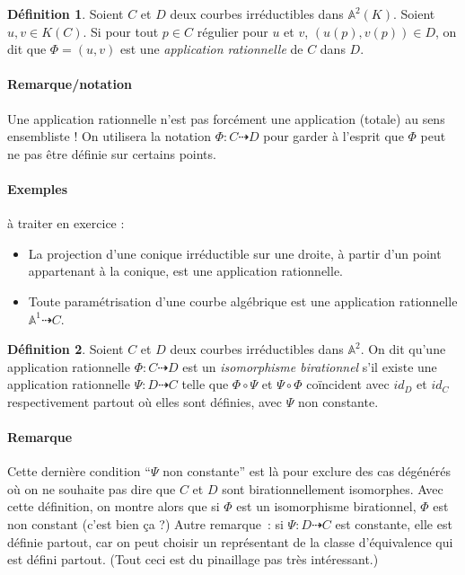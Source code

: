 \documentclass[a4paper, 11pt]{article}
\theoremstyle{definition}
\newtheorem{définition}{Définition}
\newcommand{\aff}{\mathbb{A}}
\begin{document}
\begin{définition}
  Soient $C$ et $D$ deux courbes irréductibles dans
  $\aff^2(K)$. Soient $u, v \in K(C)$. Si pour tout $p \in C$ régulier
  pour $u$ et $v$, $(u(p), v(p)) \in D$, on dit que $\Phi = (u,v)$ est
  une \emph{application rationnelle} de $C$ dans $D$.
\end{définition}
\paragraph{Remarque/notation} Une application rationnelle n'est pas
forcément une application (totale) au sens ensembliste ! On utilisera
la notation $\Phi : C \dashrightarrow D$ pour garder à l'esprit que
$\Phi$ peut ne pas être définie sur certains points.

\paragraph{Exemples} à traiter en exercice :
\begin{itemize}
\item La projection d'une conique irréductible sur une droite, à
  partir d'un point appartenant à la conique, est une application
  rationnelle.
\item Toute paramétrisation d'une courbe algébrique est une
  application rationnelle $\aff^1 \dashrightarrow C$.
\end{itemize}

\begin{définition}
  Soient $C$ et $D$ deux courbes irréductibles dans $\aff^2$. On dit
  qu'une application rationnelle $\Phi : C \dashrightarrow D$ est un
  \emph{isomorphisme birationnel} s'il existe une application
  rationnelle $\Psi : D \dashrightarrow C$ telle que $\Phi \circ \Psi$
  et $\Psi \circ \Phi$ coïncident avec $id_D$ et $id_C$ respectivement
  partout où elles sont définies, avec $\Psi$ non constante.
\end{définition}
\paragraph{Remarque} Cette dernière condition \enquote{$\Psi$ non
  constante} est là pour exclure des cas dégénérés où on ne souhaite
pas dire que $C$ et $D$ sont birationnellement isomorphes. Avec cette
définition, on montre alors que si $\Phi$ est un isomorphisme
birationnel, $\Phi$ est non constant (c'est bien ça ?) Autre
remarque~: si $\Psi : D \dashrightarrow C$ est constante, elle est
définie partout, car on peut choisir un représentant de la classe
d'équivalence qui est défini partout. (Tout ceci est du pinaillage pas
très intéressant.)
\end{document}
